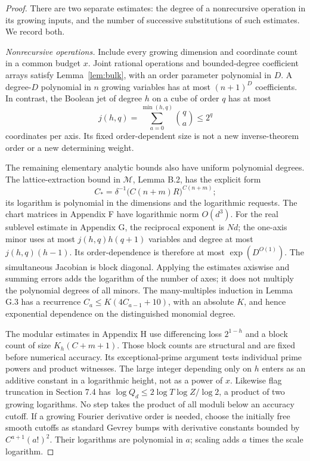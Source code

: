 \documentclass[11pt,a4paper]{article}
\theoremstyle{definition}
\newcommand{\M}{\mathcal M}
\begin{document}
\begin{proof}
There are two separate estimates: the degree of a nonrecursive
operation in its growing inputs, and the number of successive
substitutions of such estimates. We record both.

\textit{Nonrecursive operations.}
Include every growing dimension and coordinate count in a common
budget \(x\). Joint rational operations and bounded-degree
coefficient arrays satisfy Lemma~\ref{lem:bulk}, with an order
parameter polynomial in \(D\). A degree-\(D\) polynomial in
\(n\) growing variables has at most \((n+1)^D\) coefficients.
In contrast, the Boolean jet of degree \(h\) on a cube of order
\(q\) has at most
\[
 j(h,q)=\sum_{a=0}^{\min(h,q)}\binom qa\le2^q
\]
coordinates per axis. Its fixed order-dependent size is not a new
inverse-theorem order or a new determining weight.

The remaining elementary analytic bounds also have uniform
polynomial degrees. The lattice-extraction bound in \(\M\), Lemma B.2,
has the explicit form
\[
 C_* =\delta^{-1}\bigl(C(n+m)R\bigr)^{C(n+m)};
\]
its logarithm is polynomial in the dimensions and the logarithmic
requests. The chart matrices in Appendix F have logarithmic norm
\(O(d^3)\). For the real sublevel estimate in Appendix G, the
reciprocal exponent is \(Nd\); the one-axis minor uses at most
\(j(h,q)h(q+1)\) variables and degree at most \(j(h,q)(h-1)\).
Its order-dependence is therefore at most \(\exp(D^{O(1)})\).
The simultaneous Jacobian is block diagonal. Applying the estimates
axiswise and summing errors adds the logarithm of the number of
axes; it does not multiply the polynomial degrees of all minors.
The many-multiples induction in Lemma G.3 has a recurrence
\(C_a\le K(4C_{a-1}+10)\), with an absolute \(K\), and hence
exponential dependence on the distinguished monomial degree.

The modular estimates in Appendix H use differencing loss
\(2^{1-h}\) and a block count of size
\(K_h(C+m+1)\). Those block counts are structural and are fixed
before numerical accuracy. Its exceptional-prime argument tests
individual prime powers and product witnesses. The large integer
depending only on \(h\) enters as an additive constant in a
logarithmic height, not as a power of \(x\). Likewise flag
truncation in Section 7.4 has
\(\log Q_d\le 2\log T\log Z/\log2\), a product of two
growing logarithms. No step takes the product of all moduli below
an accuracy cutoff. If a growing Fourier derivative order is
needed, choose the initially free smooth cutoffs as standard
Gevrey bumps with derivative constants bounded by
\(C^{a+1}(a!)^2\). Their logarithms are polynomial in \(a\);
scaling adds \(a\) times the scale logarithm.


\end{proof}
\end{document}
